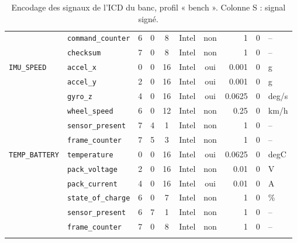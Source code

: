 \begin{longtable}{llrrcccrrl}
 & \texttt{command\_counter} & 6 & 0 & 8 & Intel & non & 1 & 0 & -- \\
 & \texttt{checksum} & 7 & 0 & 8 & Intel & non & 1 & 0 & -- \\
\addlinespace
\texttt{IMU\_SPEED} & \texttt{accel\_x} & 0 & 0 & 16 & Intel & oui & 0.001 & 0 & g \\
 & \texttt{accel\_y} & 2 & 0 & 16 & Intel & oui & 0.001 & 0 & g \\
 & \texttt{gyro\_z} & 4 & 0 & 16 & Intel & oui & 0.0625 & 0 & deg/s \\
 & \texttt{wheel\_speed} & 6 & 0 & 12 & Intel & non & 0.25 & 0 & km/h \\
 & \texttt{sensor\_present} & 7 & 4 & 1 & Intel & non & 1 & 0 & -- \\
 & \texttt{frame\_counter} & 7 & 5 & 3 & Intel & non & 1 & 0 & -- \\
\addlinespace
\texttt{TEMP\_BATTERY} & \texttt{temperature} & 0 & 0 & 16 & Intel & oui & 0.0625 & 0 & degC \\
 & \texttt{pack\_voltage} & 2 & 0 & 16 & Intel & non & 0.01 & 0 & V \\
 & \texttt{pack\_current} & 4 & 0 & 16 & Intel & oui & 0.01 & 0 & A \\
 & \texttt{state\_of\_charge} & 6 & 0 & 7 & Intel & non & 1 & 0 & \% \\
 & \texttt{sensor\_present} & 6 & 7 & 1 & Intel & non & 1 & 0 & -- \\
 & \texttt{frame\_counter} & 7 & 0 & 8 & Intel & non & 1 & 0 & -- \\
\addlinespace
\caption{Encodage des signaux de l'ICD du banc, profil « bench ». Colonne S : signal signé.}
\label{tab:icd-encodage}
\end{longtable}
